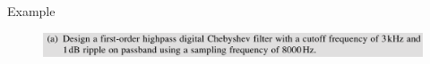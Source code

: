 \documentclass[pdflatex,compress,mathserif]{beamer}
\begin{document}
\begin{frame}{Example}
    \begin{figure}
        \centering
        \includegraphics[width=\linewidth]{./img/img23.png}
    \end{figure}
\end{frame}
\end{document}
